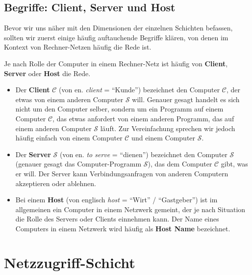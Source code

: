 \subsection{Begriffe: Client, Server und Host}
Bevor wir uns näher mit den Dimensionen der einzelnen Schichten befassen, sollten wir zuerst einige häufig auftauchende Begriffe klären, von denen im Kontext von Rechner-Netzen häufig die Rede ist.

\begin{mydefinition}\label{def:client-server-host}
Je nach Rolle der Computer in einem Rechner-Netz ist häufig von \textbf{Client}, \textbf{Server} oder \textbf{Host} die Rede.
\begin{itemize}
	\item Der \textbf{Client} $\mathcal{C}$ (von en. \textit{client} = \enquote{Kunde}) bezeichnet den Computer $\mathcal{C}$, der etwas von einem anderen Computer $\mathcal{S}$ will. Genauer gesagt handelt es sich nicht um den Computer selber, sondern um ein Programm auf einem Computer $\mathcal{C}$, das etwas anfordert von einem anderen Programm, das auf einem anderen Computer $\mathcal{S}$ läuft. Zur Vereinfachung sprechen wir jedoch häufig einfach von einem Computer $\mathcal{C}$ und einem Computer $\mathcal{S}$.
	\item Der \textbf{Server} $\mathcal{S}$ (von en. \textit{to serve} = \enquote{dienen}) bezeichnet  den Computer $\mathcal{S}$ (genauer gesagt das Computer-Programm $\mathcal{S}$), das dem Computer $\mathcal{C}$ gibt, was er will. Der Server kann Verbindungsanfragen von anderen Computern akzeptieren oder ablehnen.
	\item Bei einem \textbf{Host} (von englisch \textit{host} = \enquote{Wirt} / \enquote{Gastgeber}) ist im allgemeinen ein Computer in einem Netzwerk gemeint, der je nach Situation die Rolle des Servers oder Clients einnehmen kann. Der Name eines Computers in einem Netzwerk wird häufig als \textbf{Host Name} bezeichnet.
\end{itemize}
\end{mydefinition}


\section{\texorpdfstring{\textcolor{\dataLinkLayerColor}{Netzzugriff-Schicht}}{Netzzugriff-Schicht}}


